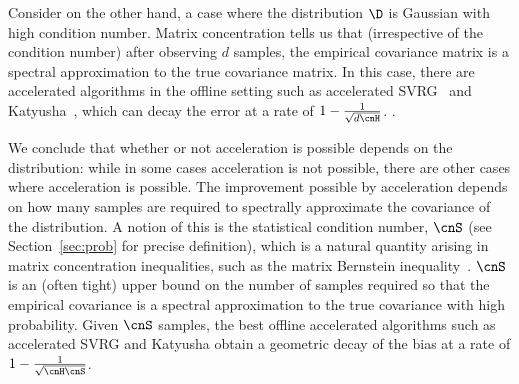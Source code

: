 Consider on the other hand, a case where the distribution $\D$ is Gaussian with high condition number. Matrix concentration tells us that (irrespective of the condition number) after observing $d$ samples, the empirical covariance matrix is a spectral approximation to the true covariance matrix. In this case, there are accelerated algorithms in the offline setting such as accelerated SVRG~\cite{FrostigGKS15b} and Katyusha~\cite{Zhu16}, which can decay the error at a rate of ${1-\frac{1}{\sqrt{d{\cnH}}}}$. .

We conclude that whether or not acceleration is possible depends on the distribution: while in some cases acceleration is not possible, there are other cases where acceleration is possible. The improvement possible by acceleration depends on how many samples are required to spectrally approximate the covariance of the distribution. A notion of this is the statistical condition number, $\cnS$ (see Section~\ref{sec:prob} for precise definition), which is a natural quantity arising in matrix concentration inequalities, such as the matrix Bernstein inequality~\cite{HsuKZ14}. $\cnS$ is an (often tight) upper bound on the number of samples required so that the empirical covariance is a spectral approximation to the true covariance with high probability. Given $\cnS$ samples, the best offline accelerated algorithms such as accelerated SVRG and Katyusha obtain a geometric decay of the bias at a rate of $1-\frac{1}{\sqrt{\cnH\cnS}}$. 

